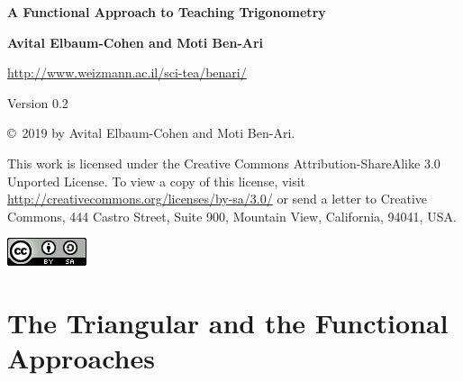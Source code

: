 
\hypersetup{pageanchor=false}
\thispagestyle{empty}

\vspace*{2ex}

\begin{center}


\textbf{\LARGE A Functional Approach to Teaching Trigonometry}

\bigskip
\bigskip
\bigskip
\bigskip

\textbf{\Large Avital Elbaum-Cohen and Moti Ben-Ari}

\bigskip
\bigskip

\url{http://www.weizmann.ac.il/sci-tea/benari/}

\bigskip

Version 0.2

\end{center}


\vfill

\begin{footnotesize}
\begin{center}
\copyright{}\ 2019 by Avital Elbaum-Cohen and Moti Ben-Ari.
\end{center}

This work is licensed under the Creative Commons Attribution-ShareAlike 3.0 Unported License. To view a copy of this license, visit \url{http://creativecommons.org/licenses/by-sa/3.0/} or send a letter to Creative Commons, 444 Castro Street, Suite 900, Mountain View, California, 94041, USA.
\end{footnotesize}

\bigskip

\begin{center}
\includegraphics[width=.15\textwidth]{../../by-sa.png}
\end{center}


\newpage
\setlength\cftbeforetoctitleskip{4ex}
\setlength\cftaftertoctitleskip{2ex}
\setlength{}

\tableofcontents
\thispagestyle{empty}


\newpage
\hypersetup{pageanchor=true}

\setcounter{page}{1}

\chapter{The Triangular and the Functional Approaches}

